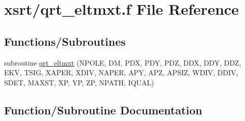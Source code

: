 \hypertarget{qrt__eltmxt_8f}{}\section{xsrt/qrt\+\_\+eltmxt.f File Reference}
\label{qrt__eltmxt_8f}
\subsection*{Functions/\+Subroutines}
\begin{DoxyCompactItemize}
\item 
subroutine \hyperlink{qrt__eltmxt_8f_a154507399c760fd0d364731d24fe4beb}{qrt\+\_\+eltmxt} (N\+P\+O\+LE, DM, P\+DX, P\+DY, P\+DZ, D\+DX, D\+DY, D\+DZ, E\+KV, T\+S\+IG, X\+A\+P\+ER, X\+D\+IV, N\+A\+P\+ER, A\+PY, A\+PZ, A\+P\+S\+IZ, W\+D\+IV, D\+D\+IV, S\+D\+ET, M\+A\+X\+ST, XP, YP, ZP, N\+P\+A\+TH, I\+Q\+U\+AL)
\end{DoxyCompactItemize}


\subsection{Function/\+Subroutine Documentation}
\mbox{\label{qrt__eltmxt_8f_a154507399c760fd0d364731d24fe4beb}} 

